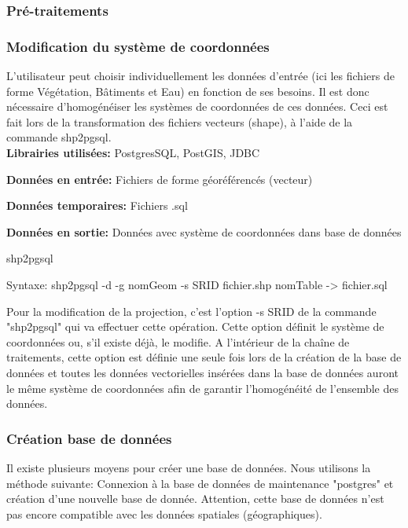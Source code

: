 \subsubsection{Pré-traitements}

\subsubsection{Modification du système de coordonnées}
L'utilisateur peut choisir individuellement les données d'entrée (ici les fichiers de forme Végétation, Bâtiments et Eau) en fonction de ses besoins. Il est donc nécessaire d'homogénéiser les systèmes de coordonnées de ces données. Ceci est fait lors de la transformation des fichiers vecteurs (shape), à l'aide de la commande shp2pgsql. \\

\textbf{Librairies utilisées:} PostgresSQL, PostGIS, JDBC 

\textbf{Données en entrée:} Fichiers de forme géoréférencés (vecteur)

\textbf{Données temporaires:} Fichiers .sql

\textbf{Données en sortie:} Données avec système de coordonnées dans base de données\\


\begin{algorithm}[H]
\caption{\label{traitement1} shp2pgsql}
Syntaxe:
shp2pgsql -d -g nomGeom -s SRID fichier.shp nomTable -> fichier.sql \\
\end{algorithm}

Pour la modification de la projection, c'est l'option -s SRID de la commande "shp2pgsql" qui va effectuer cette opération. Cette option définit le système de coordonnées ou, s'il existe déjà, le modifie. A l'intérieur de la chaîne de traitements, cette option est définie une seule fois  lors de la création de la base de données et toutes les données vectorielles insérées dans la base de données auront le même système de coordonnées afin de garantir l'homogénéité de l'ensemble des données.




\subsubsection{Création base de données}

Il existe plusieurs moyens pour créer une base de données. Nous utilisons la méthode suivante: Connexion à la base de données de maintenance "postgres" et création d'une nouvelle base de donnée. Attention, cette base de données n'est pas encore compatible avec les données spatiales (géographiques).\\

